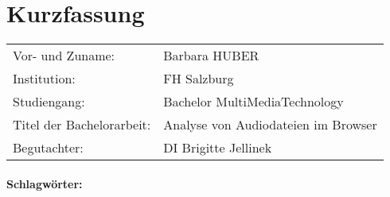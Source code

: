 \section*{Kurzfassung}
\begin{tabular}{l l}
Vor- und Zuname:& Barbara HUBER\\
Institution: & FH Salzburg\\ 
Studiengang: &  Bachelor MultiMediaTechnology\\ 
Titel der Bachelorarbeit: & Analyse von Audiodateien im Browser\\
Begutachter: & DI Brigitte Jellinek\\ 
\end{tabular} 
\vspace{0.5cm}



\paragraph{Schlagwörter:}

